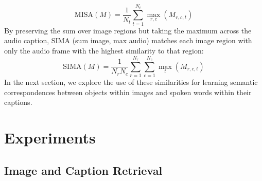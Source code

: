 \begin{equation}
\text{MISA}(M) = \frac{1}{N_t}\sum_{t=1}^{N_t}{\max_{r,c}(M_{r,c,t})}
\end{equation}
By preserving the sum over image regions but taking the maximum across the audio caption, SIMA (sum image, max audio) matches each image region with only the audio frame with the highest similarity to that region:
\begin{equation}
\text{SIMA}(M) = \frac{1}{N_r N_c}\sum_{r=1}^{N_r}{\sum_{c=1}^{N_c}{\max_t(M_{r,c,t})}}
\end{equation}
In the next section, we explore the use of these similarities for learning semantic correspondences between objects within images and spoken words within their captions.

\section{Experiments}
\subsection{Image and Caption Retrieval}
\label{sec:retrieval}

